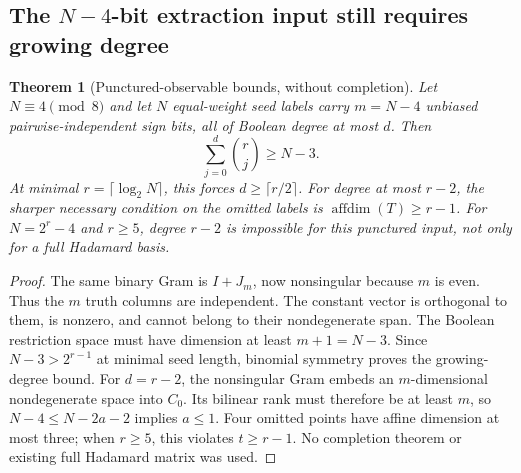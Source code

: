 \documentclass[11pt]{article}
\newtheorem{theorem}{Theorem}[section]
\begin{document}
\subsection{The $N-4$-bit extraction input still requires growing degree}
\begin{theorem}[Punctured-observable bounds, without completion]
\label{thm:nonlinear-punctured}
Let $N\equiv4\pmod8$ and let $N$ equal-weight seed labels carry $m=N-4$
unbiased pairwise-independent sign bits, all of Boolean degree at most
$d$. Then
\[
 \sum_{j=0}^d\binom rj\ge N-3.
\]
At minimal $r=\lceil\log_2N\rceil$, this forces
$d\ge\lceil r/2\rceil$. For degree at most $r-2$, the sharper necessary
condition on the omitted labels is $\operatorname{affdim}(T)\ge r-1$.
For $N=2^r-4$ and $r\ge5$, degree $r-2$ is impossible for this punctured
input, not only for a full Hadamard basis.
\end{theorem}
\begin{proof}
The same binary Gram is $I+J_m$, now nonsingular because $m$ is even.
Thus the $m$ truth columns are independent. The constant vector is
orthogonal to them, is nonzero, and cannot belong to their nondegenerate
span. The Boolean restriction space must have dimension at least
$m+1=N-3$. Since $N-3>2^{r-1}$ at minimal seed length, binomial symmetry
proves the growing-degree bound.
For $d=r-2$, the nonsingular Gram embeds an $m$-dimensional nondegenerate
space into $C_0$. Its bilinear rank must therefore be at least $m$,
so $N-4\le N-2a-2$ implies $a\le1$. Four omitted points have affine
dimension at most three; when $r\ge5$, this violates $t\ge r-1$.
No completion theorem or existing full Hadamard matrix was used.
\end{proof}
\end{document}
